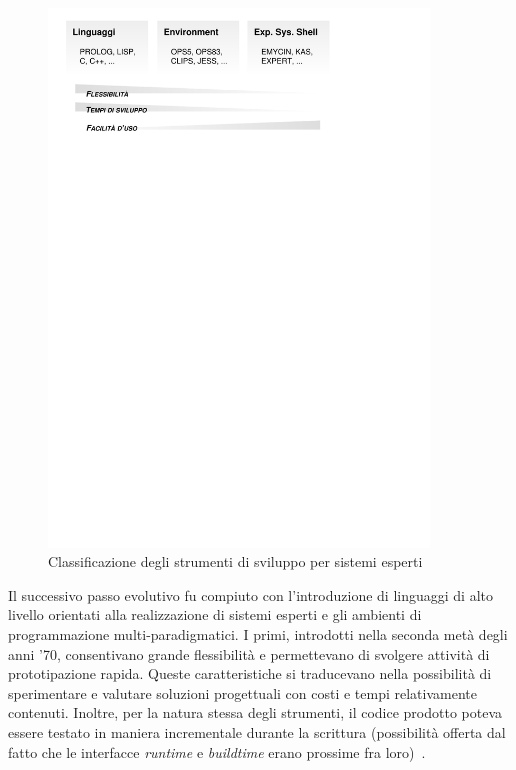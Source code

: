 \begin{figure}
\centering
\includegraphics[width=0.9\textwidth, viewport=28 650 440 824]{Immagini/Capitolo1/Classificazione-tools.pdf}
\caption{Classificazione degli strumenti di sviluppo per sistemi esperti}\label{fig:classificazione-tools}
\end{figure}

Il successivo passo evolutivo fu compiuto con l'introduzione di linguaggi di alto livello orientati alla realizzazione di sistemi esperti e gli ambienti di programmazione multi-paradigmatici.
I primi, introdotti nella seconda metà degli anni '70, consentivano grande flessibilità e permettevano di svolgere attività di prototipazione rapida. Queste caratteristiche si traducevano nella possibilità di sperimentare  e valutare soluzioni progettuali con costi e tempi relativamente contenuti. Inoltre, per la natura stessa degli strumenti, il codice prodotto poteva essere testato in maniera incrementale durante la scrittura (possibilità offerta dal fatto che le interfacce \emph{runtime} e \emph{buildtime} erano prossime fra loro)~\cite{jackson1999}.

